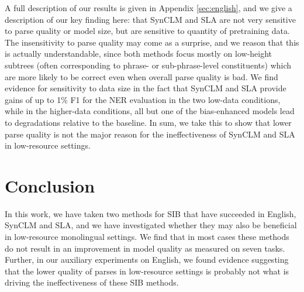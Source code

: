 \documentclass[11pt]{article}
\begin{document}
A full description of our results is given in Appendix \ref{sec:english}, and we give a description of our key finding here: that SynCLM and SLA are not very sensitive to parse quality or model size, but are sensitive to quantity of pretraining data.
The insensitivity to parse quality may come as a surprise, and we reason that this is actually understandable, since both methods focus mostly on low-height subtrees (often corresponding to phrase- or sub-phrase-level constituents) which are more likely to be correct even when overall parse quality is bad.
We find evidence for sensitivity to data size in the fact that SynCLM and SLA provide gains of up to 1\% F1 for the NER evaluation in the two low-data conditions, while in the higher-data conditions, all but one of the bias-enhanced models lead to degradations relative to the baseline.
In sum, we take this to show that lower parse quality is not the major reason for the ineffectiveness of SynCLM and SLA in low-resource settings.

\section{Conclusion}
In this work, we have taken two methods for SIB that have succeeded in English, SynCLM and SLA, and we have investigated whether they may also be beneficial in low-resource monolingual settings.
We find that in most cases these methods do not result in an improvement in model quality as measured on seven tasks.
Further, in our auxiliary experiments on English, we found evidence suggesting that the lower quality of parses in low-resource settings is probably not what is driving the ineffectiveness of these SIB methods.
\end{document}
